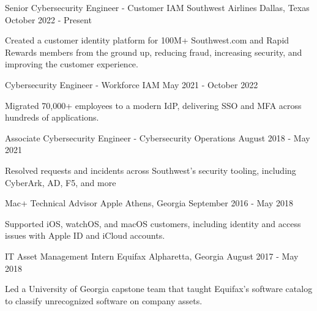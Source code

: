 \begin{cventries}
  \cventry
    {Senior Cybersecurity Engineer - Customer IAM}
    {Southwest Airlines}
    {Dallas, Texas}
    {October 2022 - Present}
    {
      \begin{cvitems}
        \item {Created a customer identity platform for 100M+ Southwest.com and Rapid Rewards members from the ground up, reducing fraud, increasing security, and improving the customer experience.}
      \end{cvitems}
    }
  \cventry
    {Cybersecurity Engineer - Workforce IAM}
    {}
    {}
    {May 2021 - October 2022}
    {
      \begin{cvitems}
        \item {Migrated 70,000+ employees to a modern IdP, delivering SSO and MFA across hundreds of applications.}
      \end{cvitems}
    }
  \cventry
    {Associate Cybersecurity Engineer - Cybersecurity Operations}
    {}
    {}
    {August 2018 - May 2021}
    {
      \begin{cvitems}
        \item {Resolved requests and incidents across Southwest's security tooling, including CyberArk, AD, F5, and more}
      \end{cvitems}
    }
  \cventry
    {Mac+ Technical Advisor}
    {Apple}
    {Athens, Georgia}
    {September 2016 - May 2018}
    {
      \begin{cvitems}
        \item {Supported iOS, watchOS, and macOS customers, including identity and access issues with Apple ID and iCloud accounts.}
      \end{cvitems}
    }
  \cventry
    {IT Asset Management Intern}
    {Equifax}
    {Alpharetta, Georgia}
    {August 2017 - May 2018}
    {
      \begin{cvitems}
        \item {Led a University of Georgia capstone team that taught Equifax's software catalog to classify unrecognized software on company assets.}
      \end{cvitems}
    }
\end{cventries}

